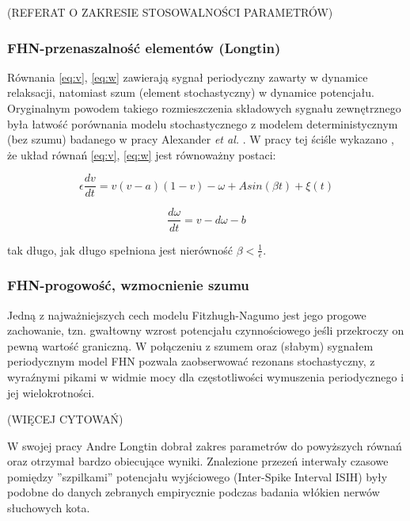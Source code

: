   (REFERAT O ZAKRESIE STOSOWALNOŚCI PARAMETRÓW)

  

  \subsubsection{FHN-przenaszalność elementów (Longtin)}

  Równania \ref{eq:v}, \ref{eq:w} zawierają sygnał periodyczny zawarty w dynamice relaksacji, natomiast szum (element stochastyczny) w dynamice potencjału. Oryginalnym powodem takiego rozmieszczenia składowych sygnału zewnętrznego była łatwość porównania modelu stochastycznego z modelem deterministycznym (bez szumu) badanego w pracy Alexander \emph{et al.} \cite{alexander}. W pracy tej ściśle wykazano \cite{longtin}, że układ równań \ref{eq:v}, \ref{eq:w} jest równoważny postaci:

  \begin{equation}
    \epsilon \frac{dv}{dt} = v(v-a)(1-v)- \omega + A sin(\beta t) + \xi(t)
  \end{equation}

  \begin{equation}
    \frac{d \omega}{dt} = v - d \omega - b
  \end{equation}

  tak długo, jak długo spełniona jest nierówność $\beta < \frac{1}{\epsilon}$.

  \subsubsection{FHN-progowość, wzmocnienie szumu}

  Jedną z najważniejszych cech modelu Fitzhugh-Nagumo jest jego progowe zachowanie, tzn. gwałtowny wzrost potencjału czynnościowego jeśli przekroczy on pewną wartość graniczną. W połączeniu z szumem oraz (słabym) sygnałem periodycznym model FHN pozwala zaobserwować rezonans stochastyczny, z wyraźnymi pikami w widmie mocy dla częstotliwości wymuszenia periodycznego i jej wielokrotności.

  (WIĘCEJ CYTOWAŃ)

  W swojej pracy \cite{longtin} Andre Longtin dobrał zakres parametrów do powyższych równań oraz otrzymał bardzo obiecujące wyniki. Znalezione przezeń interwały czasowe pomiędzy ''szpilkami'' potencjału wyjściowego (Inter-Spike Interval ISIH) były podobne do danych zebranych empirycznie podczas badania włókien nerwów słuchowych kota.

